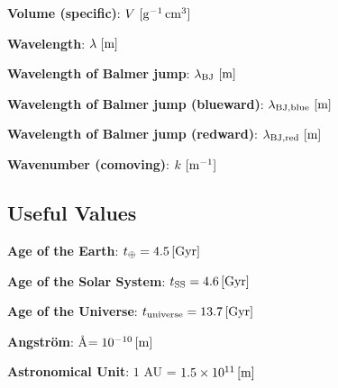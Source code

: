 \documentclass[a4paper,10pt]{article}
\begin{document}
{\noindent}\textbf{Volume (specific)}: $V ~ [{\rm g^{-1}\,cm^3}]$

{\noindent}\textbf{Wavelength}: $\lambda ~ [{\rm m}]$

{\noindent}\textbf{Wavelength of Balmer jump}: $\lambda_{\rm BJ} ~ [{\rm m}]$

{\noindent}\textbf{Wavelength of Balmer jump (blueward)}: $\lambda_{\rm BJ,blue} ~ [{\rm m}]$

{\noindent}\textbf{Wavelength of Balmer jump (redward)}: $\lambda_{\rm BJ,red} ~ [{\rm m}]$

{\noindent}\textbf{Wavenumber (comoving)}: $k ~ [{\rm m^{-1}}]$






































\newpage
\subsection{Useful Values}

{\noindent}\textbf{Age of the Earth}: $t_\oplus = 4.5\,[{\rm Gyr}]$

{\noindent}\textbf{Age of the Solar System}: $t_\mathrm{SS} = 4.6\,[{\rm Gyr}]$

{\noindent}\textbf{Age of the Universe}: $t_\mathrm{universe} = 13.7\,[{\rm Gyr}]$

{\noindent}\textbf{Angstr\"{o}m}: \AA$ = 10^{-10}\,[{\rm m}]$

{\noindent}\textbf{Astronomical Unit}: $1$ AU = $1.5\times10^{11}\,[{\rm m}]$
\end{document}
